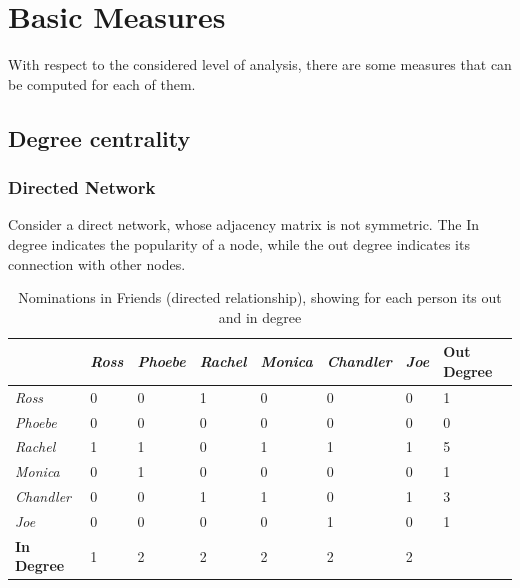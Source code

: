 \documentclass[
  notitlepage,
  onecolumn,
  openany]{book}
\begin{document}
\hypertarget{basic-measures}{%
\chapter{Basic Measures}\label{basic-measures}}

With respect to the considered level of analysis, there are some measures that can be computed for each of them.

\hypertarget{degree-centrality}{%
\section{Degree centrality}\label{degree-centrality}}

\hypertarget{directed-network}{%
\subsection{Directed Network}\label{directed-network}}

Consider a direct network, whose adjacency matrix is not symmetric. The In degree indicates the popularity of a node, while the out degree indicates its connection with other nodes.

\begin{table}[h]
\centering
\begin{tabular}{@{}llllllll@{}}
\toprule
                   & \textit{Ross} & \textit{Phoebe} & \textit{Rachel} & \textit{Monica} & \textit{Chandler} & \textit{Joe} & \textbf{Out Degree} \\ \midrule
\textit{Ross}      & 0             & 0               & 1               & 0               & 0                 & 0            & 1                   \\
\textit{Phoebe}    & 0             & 0               & 0               & 0               & 0                 & 0            & 0                   \\
\textit{Rachel}    & 1             & 1               & 0               & 1               & 1                 & 1            & 5                   \\
\textit{Monica}    & 0             & 1               & 0               & 0               & 0                 & 0            & 1                   \\
\textit{Chandler}  & 0             & 0               & 1               & 1               & 0                 & 1            & 3                   \\
\textit{Joe}       & 0             & 0               & 0               & 0               & 1                 & 0            & 1                   \\
\textbf{In Degree} & 1             & 2               & 2               & 2               & 2                 & 2            &                     \\ \bottomrule
\end{tabular}
\caption{Nominations in Friends (directed relationship), showing for each person its out and in degree}
\label{tab:dir_degree}
\end{table}
\end{document}
